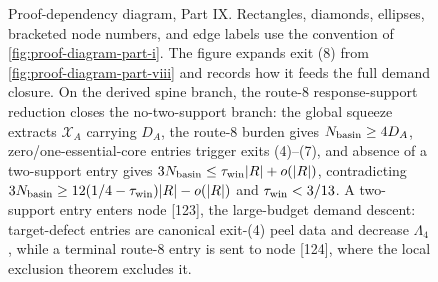 \documentclass[11pt]{article}
\begin{document}
\begin{figure}[p]
{%
}
\caption[Proof-dependency diagram, Part IX]{Proof-dependency diagram, Part IX.  Rectangles, diamonds, ellipses, bracketed node numbers, and edge labels use the convention of \cref{fig:proof-diagram-part-i}.  The figure expands exit (8) from \cref{fig:proof-diagram-part-viii} and records how it feeds the full demand closure.  On the derived spine branch, the route-8 response-support reduction closes the no-two-support branch: the global squeeze extracts $\mathcal X_A$ carrying $D_A$, the route-8 burden gives \(N_{\rm basin}\ge4D_A\), zero/one-essential-core entries trigger exits (4)--(7), and absence of a two-support entry gives \(3N_{\rm basin}\le\tau_{\rm win}|R|+o(|R|)\), contradicting \(3N_{\rm basin}\ge12(1/4-\tau_{\rm win})|R|-o(|R|)\) and \(\tau_{\rm win}<3/13\).  A two-support entry enters node [123], the large-budget demand descent: target-defect entries are canonical exit-\textup{(4)} peel data and decrease \(\Lambda_4\), while a terminal route-8 entry is sent to node [124], where the local exclusion theorem excludes it.}
\label{fig:proof-diagram-part-ix}
\end{figure}

\clearpage
\end{document}
